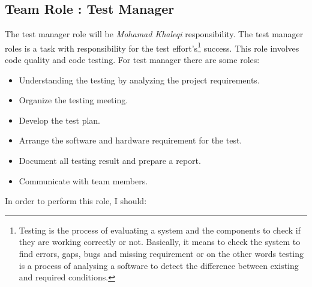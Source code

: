 \documentclass{article}
\begin{document}
\subsection{Team Role : Test Manager}
The test manager role will be \textit{Mohamad Khaleqi} responsibility. The test manager roles is a task with responsibility for the test effort's\footnote{Testing is the process of evaluating a system and the components to check if they are working correctly or not. Basically, it means to check the system to find errors, gaps, bugs and missing requirement or on the other words testing is a process of analysing a software to detect the difference between existing and required conditions.
} success. This role involves code quality and code testing. For test manager there are some roles:
\begin{itemize}
 \item Understanding the testing by analyzing the project requirements.
 \item Organize the testing meeting.
 \item Develop the test plan.
 \item Arrange the software and hardware requirement for the test.
 \item Document all testing result and prepare a report.
 \item Communicate with team members.
\end{itemize}
In order to perform this role, I should:
\end{document}
